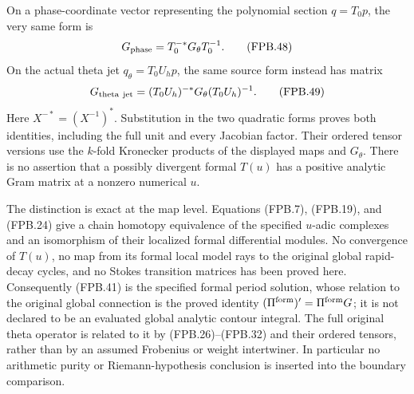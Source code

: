 On a phase-coordinate vector representing the polynomial section
\(q=T_0p\), the very same form is
\[
 G_{\rm phase}=T_0^{-*}G_\theta T_0^{-1}.
 \tag{FPB.48}\label{GraphV2:eq:fpb-pulled-metric}
\]
On the actual theta jet \(q_\theta=T_0U_hp\), the same source
form instead has matrix
\[
 G_{\rm theta\ jet}=(T_0U_h)^{-*}G_\theta(T_0U_h)^{-1}.
 \tag{FPB.49}\label{GraphV2:eq:fpb-theta-jet-metric}
\]
Here \(X^{-*}=(X^{-1})^*\). Substitution in the two quadratic
forms proves both identities, including the full unit and every
Jacobian factor. Their ordered tensor versions use the \(k\)-fold
Kronecker products of the displayed maps and \(G_\theta\).
There is no assertion that a possibly divergent formal \(T(u)\)
has a positive analytic Gram matrix at a nonzero numerical \(u\).

The distinction is exact at the map level. Equations (FPB.7),
(FPB.19), and (FPB.24) give a chain homotopy equivalence of the
specified \(u\)-adic complexes and an isomorphism of their localized
formal differential modules. No convergence of \(T(u)\), no map
from its formal local model rays to the original global rapid-decay
cycles, and no Stokes transition matrices has been proved here.
Consequently (FPB.41) is the specified formal period solution, whose
relation to the original global connection is the proved identity
\((\Pi^{\rm form})'=\Pi^{\rm form}G\); it is not declared to be
an evaluated global analytic contour integral. The full original
theta operator is related to it by (FPB.26)--(FPB.32) and their
ordered tensors, rather than by an assumed Frobenius or weight
intertwiner. In particular no arithmetic purity or Riemann-hypothesis
conclusion is inserted into the boundary comparison.
